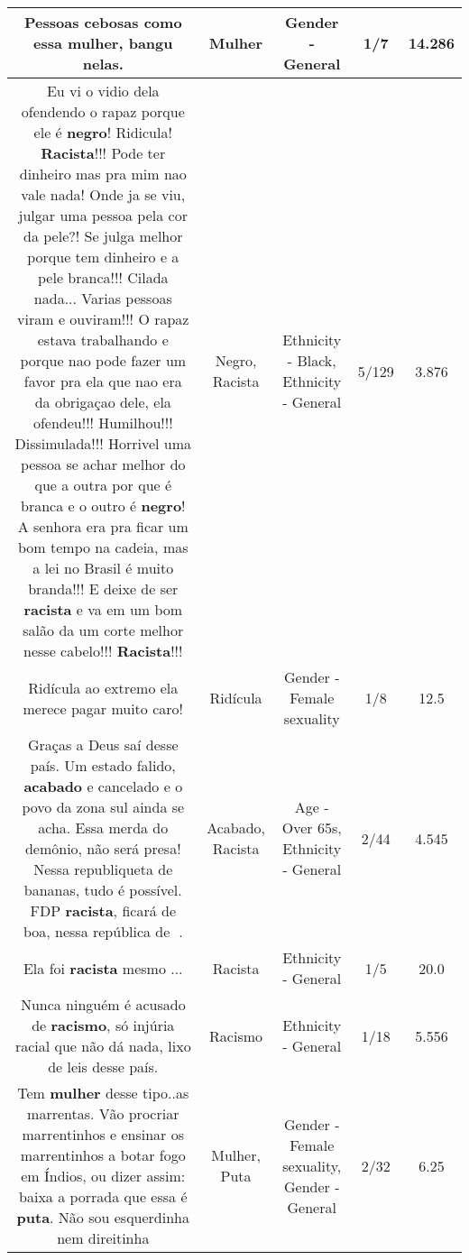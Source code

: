 \documentclass[11pt]{article}
\newlength\mylength
\begin{document}
\begin{center}
\begin{longtable}{|C{.65\mylength}|C{.30\mylength}|C{.12\mylength}|C{.12\mylength}|C{.12\mylength}|}
  \small Pessoas cebosas como essa \textbf{mulher}, bangu nelas.\normalsize   & Mulher & Gender - General & 1/7 & 14.286 \\  \hline
  \small Eu vi o vidio dela ofendendo o rapaz porque ele é \textbf{negro}! Ridicula! \textbf{Racista}!!! Pode ter dinheiro mas pra mim nao vale nada! Onde ja se viu, julgar uma pessoa pela cor da pele?! Se julga melhor porque tem dinheiro e a pele branca!!! Cilada nada... Varias pessoas viram e ouviram!!! O rapaz estava trabalhando e porque nao pode fazer um favor pra ela que nao era da obrigaçao dele, ela ofendeu!!! Humilhou!!! Dissimulada!!! Horrivel uma pessoa se achar melhor do que a outra por que é branca e o outro é \textbf{negro}! A senhora era pra ficar um bom tempo na cadeia, mas a lei no Brasil é muito branda!!! E deixe de ser \textbf{racista} e va em um bom salão da um corte melhor nesse cabelo!!! \textbf{Racista}!!!\normalsize   & Negro, Racista & Ethnicity - Black, Ethnicity - General & 5/129 & 3.876 \\  \hline
  \small Ridícula ao extremo ela merece pagar muito caro!\normalsize   & Ridícula & Gender - Female sexuality & 1/8 & 12.5 \\  \hline
  \small Graças a Deus saí desse país. Um estado falido, \textbf{acabado} e cancelado e o povo da zona sul ainda se acha. Essa merda do demônio, não será presa! Nessa republiqueta de bananas, tudo é possível. FDP \textbf{racista}, ficará de boa, nessa república de 🍌.\normalsize   & Acabado, Racista & Age - Over 65s, Ethnicity - General & 2/44 & 4.545 \\  \hline
  \small Ela foi \textbf{racista} mesmo ...\normalsize   & Racista & Ethnicity - General & 1/5 & 20.0 \\  \hline
  \small Nunca ninguém é acusado de \textbf{racismo}, só injúria racial que não dá nada, lixo de leis desse país.\normalsize   & Racismo & Ethnicity - General & 1/18 & 5.556 \\  \hline
  \small Tem \textbf{mulher} desse tipo..as marrentas. Vão procriar marrentinhos e ensinar os marrentinhos a botar fogo em Índios, ou dizer assim: baixa a porrada que essa é \textbf{puta}. Não sou esquerdinha nem direitinha\normalsize   & Mulher, Puta & Gender - Female sexuality, Gender - General & 2/32 & 6.25 \\  \hline

\end{longtable}
\end{center}
\end{document}
